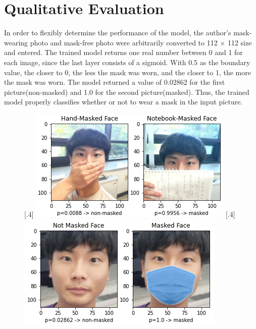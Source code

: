 \documentclass{article}
\begin{document}
\section{Qualitative Evaluation}
In order to flexibly determine the performance of the model, the author's mask-wearing photo and mask-free photo were arbitrarily converted to 112 $\times$ 112 size and entered.
The trained model returns one real number between 0 and 1 for each image, since the last layer consists of a sigmoid.
With 0.5 as the boundary value, the closer to 0, the less the mask was worn, and the closer to 1, the more the mask was worn.
The model returned a value of 0.02862 for the first picture(non-masked) and 1.0 for the second picture(masked).
Thus, the trained model properly classifies whether or not to wear a mask in the input picture.

\begin{figure}[H]
\centering
{}[.4\textwidth] {
	\includegraphics[scale=0.4]{images/result2.png}
}
[.4\textwidth] {
	\includegraphics[scale=0.4]{images/result.png}
}

\end{figure}
\end{document}
